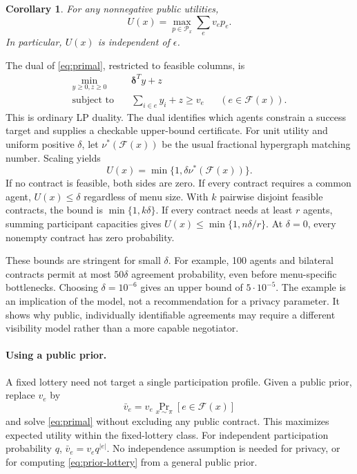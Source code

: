 \documentclass[sigconf,nonacm]{aamas}
\newcommand{\F}{\mathcal F}
\newcommand{\PP}{\mathcal P}
\newtheorem{corollary}[theorem]{Corollary}
\begin{document}
\begin{corollary}\label{cor:lp}
For any nonnegative public utilities,
\begin{equation}\label{eq:primal}
 U(x)=\max_{p\in\PP_x}\sum_e v_ep_e.
\end{equation}
In particular, $U(x)$ is independent of $\epsilon$.
\end{corollary}
The dual of \eqref{eq:primal}, restricted to feasible columns, is
\begin{equation}\label{eq:dual}
\begin{aligned}
 \min_{y\geq0,z\geq0}\quad&\boldsymbol\delta^Ty+z\\
 \text{subject to}\quad&\sum_{i\in e}y_i+z\geq v_e
                   &&(e\in\F(x)).
\end{aligned}
\end{equation}
This is ordinary LP duality. The dual identifies which agents constrain a success target and supplies a checkable upper-bound certificate. For unit utility and uniform positive $\delta$, let $\nu^*(\F(x))$ be the usual fractional hypergraph matching number. Scaling yields
\begin{equation}\label{eq:nu}
 U(x)=\min\{1,\delta\nu^*(\F(x))\}.
\end{equation}
If no contract is feasible, both sides are zero. If every contract requires a common agent, $U(x)\leq\delta$ regardless of menu size. With $k$ pairwise disjoint feasible contracts, the bound is $\min\{1,k\delta\}$. If every contract needs at least $r$ agents, summing participant capacities gives $U(x)\leq\min\{1,n\delta/r\}$. At $\delta=0$, every nonempty contract has zero probability.

These bounds are stringent for small $\delta$. For example, 100 agents and bilateral contracts permit at most $50\delta$ agreement probability, even before menu-specific bottlenecks. Choosing $\delta=10^{-6}$ gives an upper bound of $5\cdot10^{-5}$. The example is an implication of the model, not a recommendation for a privacy parameter. It shows why public, individually identifiable agreements may require a different visibility model rather than a more capable negotiator.

\paragraph{Using a public prior.}
A fixed lottery need not target a single participation profile. Given a public prior, replace $v_e$ by
\begin{equation}\label{eq:prior-lottery}
 \bar v_e=v_e\Pr_{x\sim\pi}[e\in\F(x)]
\end{equation}
and solve \eqref{eq:primal} without excluding any public contract. This maximizes expected utility within the fixed-lottery class. For independent participation probability $q$, $\bar v_e=v_eq^{|e|}$. No independence assumption is needed for privacy, or for computing \eqref{eq:prior-lottery} from a general public prior.
\end{document}
